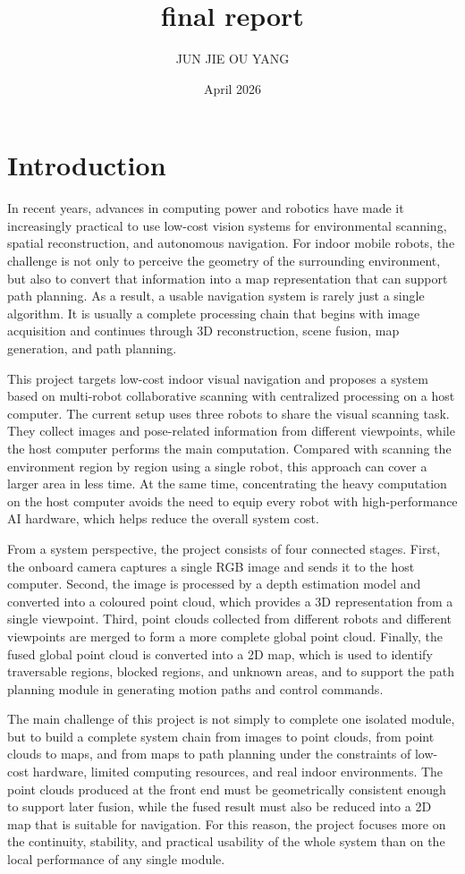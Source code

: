 \documentclass{article}
\title{final report}
\author{JUN JIE OU YANG}
\date{April 2026}
\begin{document}
\maketitle
\section{Introduction}

In recent years, advances in computing power and robotics have made it increasingly practical to use low-cost vision systems for environmental scanning, spatial reconstruction, and autonomous navigation. For indoor mobile robots, the challenge is not only to perceive the geometry of the surrounding environment, but also to convert that information into a map representation that can support path planning. As a result, a usable navigation system is rarely just a single algorithm. It is usually a complete processing chain that begins with image acquisition and continues through 3D reconstruction, scene fusion, map generation, and path planning.

This project targets low-cost indoor visual navigation and proposes a system based on multi-robot collaborative scanning with centralized processing on a host computer. The current setup uses three robots to share the visual scanning task. They collect images and pose-related information from different viewpoints, while the host computer performs the main computation. Compared with scanning the environment region by region using a single robot, this approach can cover a larger area in less time. At the same time, concentrating the heavy computation on the host computer avoids the need to equip every robot with high-performance AI hardware, which helps reduce the overall system cost.

From a system perspective, the project consists of four connected stages. First, the onboard camera captures a single RGB image and sends it to the host computer. Second, the image is processed by a depth estimation model and converted into a coloured point cloud, which provides a 3D representation from a single viewpoint. Third, point clouds collected from different robots and different viewpoints are merged to form a more complete global point cloud. Finally, the fused global point cloud is converted into a 2D map, which is used to identify traversable regions, blocked regions, and unknown areas, and to support the path planning module in generating motion paths and control commands.

The main challenge of this project is not simply to complete one isolated module, but to build a complete system chain from images to point clouds, from point clouds to maps, and from maps to path planning under the constraints of low-cost hardware, limited computing resources, and real indoor environments. The point clouds produced at the front end must be geometrically consistent enough to support later fusion, while the fused result must also be reduced into a 2D map that is suitable for navigation. For this reason, the project focuses more on the continuity, stability, and practical usability of the whole system than on the local performance of any single module.
\end{document}
